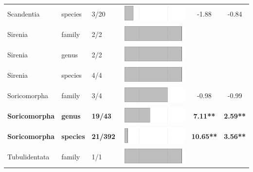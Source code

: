 \begin{longtable}{lL{1.8cm}C{2cm}lcc}
  Scandentia & species & 3/20 & \includegraphics[width=0.20\linewidth, height=0.05\linewidth]{Supplementaries/Figures/Chapter2/Results_1c/Table_figures/bar75.pdf} & -1.88 & -0.84 \\ 
  Sirenia & family & 2/2 & \includegraphics[width=0.20\linewidth, height=0.05\linewidth]{Supplementaries/Figures/Chapter2/Results_1c/Table_figures/bar76.pdf} &   &   \\ 
  Sirenia & genus & 2/2 & \includegraphics[width=0.20\linewidth, height=0.05\linewidth]{Supplementaries/Figures/Chapter2/Results_1c/Table_figures/bar77.pdf} &   &   \\ 
  Sirenia & species & 4/4 & \includegraphics[width=0.20\linewidth, height=0.05\linewidth]{Supplementaries/Figures/Chapter2/Results_1c/Table_figures/bar78.pdf} &   &   \\ 
  Soricomorpha & family & 3/4 & \includegraphics[width=0.20\linewidth, height=0.05\linewidth]{Supplementaries/Figures/Chapter2/Results_1c/Table_figures/bar79.pdf} & -0.98 & -0.99 \\ 
  \textbf{Soricomorpha} & \textbf{genus} & \textbf{19/43} & \includegraphics[width=0.20\linewidth, height=0.05\linewidth]{Supplementaries/Figures/Chapter2/Results_1c/Table_figures/bar80.pdf} & \textbf{7.11**} & \textbf{2.59**} \\ 
  \textbf{Soricomorpha} & \textbf{species} & \textbf{21/392} & \includegraphics[width=0.20\linewidth, height=0.05\linewidth]{Supplementaries/Figures/Chapter2/Results_1c/Table_figures/bar81.pdf} & \textbf{10.65**} & \textbf{3.56**} \\ 
  Tubulidentata & family & 1/1 & \includegraphics[width=0.20\linewidth, height=0.05\linewidth]{Supplementaries/Figures/Chapter2/Results_1c/Table_figures/bar82.pdf} &   &   \\ 

\end{longtable}
